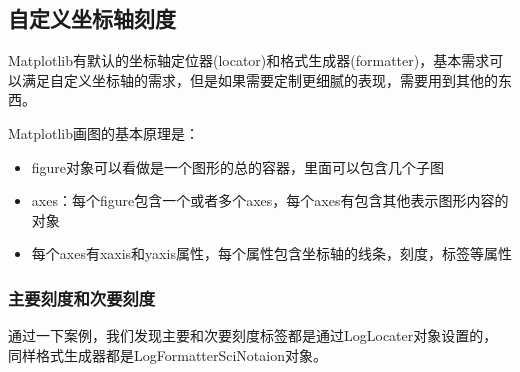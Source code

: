 \documentclass[letterpaper,10pt,english]{sphinxhowto}
\begin{document}


\subsection{自定义坐标轴刻度}
\label{\detokenize{_u6587_u5b57_u4e0e_u6ce8_u91ca:id4}}
Matplotlib有默认的坐标轴定位器(locator)和格式生成器(formatter)，基本需求可以满足自定义坐标轴的需求，但是如果需要定制更细腻的表现，需要用到其他的东西。

Matplotlib画图的基本原理是：
\begin{itemize}
\item {} 
figure对象可以看做是一个图形的总的容器，里面可以包含几个子图

\item {} 
axes：每个figure包含一个或者多个axes，每个axes有包含其他表示图形内容的对象

\item {} 
每个axes有xaxis和yaxis属性，每个属性包含坐标轴的线条，刻度，标签等属性

\end{itemize}


\subsubsection{主要刻度和次要刻度}
\label{\detokenize{_u6587_u5b57_u4e0e_u6ce8_u91ca:id5}}
通过一下案例，我们发现主要和次要刻度标签都是通过LogLocater对象设置的， 同样格式生成器都是LogFormatterSciNotaion对象。

%
\begin{sphinxVerbatim}[commandchars=\\\{\}]
   


\end{sphinxVerbatim}
\end{document}
